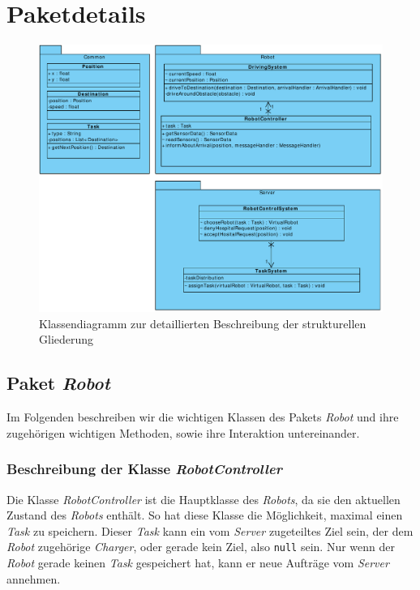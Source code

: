 \section{Paketdetails}
\begin{figure}[H]
\centering
\includegraphics[width=1\textwidth]{img/7-paketdetails}
\caption{Klassendiagramm zur detaillierten Beschreibung der strukturellen Gliederung}
\label{Paketdetails}
\end{figure}

\subsection{Paket \textit{Robot}}
	Im Folgenden beschreiben wir die wichtigen Klassen des Pakets \textit{Robot} 
	und ihre zugehörigen wichtigen Methoden, sowie ihre Interaktion untereinander. 


	\subsubsection{Beschreibung der Klasse \textit{RobotController}}
		
		Die Klasse \textit{RobotController} ist die Hauptklasse des \textit{Robots}, 
		da sie den aktuellen Zustand des \textit{Robots} enthält.
		So hat diese Klasse die Möglichkeit, maximal einen \textit{Task} zu speichern. 
		Dieser \textit{Task} kann ein vom \textit{Server} zugeteiltes Ziel sein, 
		der dem \textit{Robot} zugehörige \textit{Charger}, oder gerade kein Ziel, 
		also \texttt{null} sein. Nur wenn der \textit{Robot} gerade keinen \textit{Task} 
		gespeichert hat, kann er neue Aufträge vom \textit{Server} annehmen.

